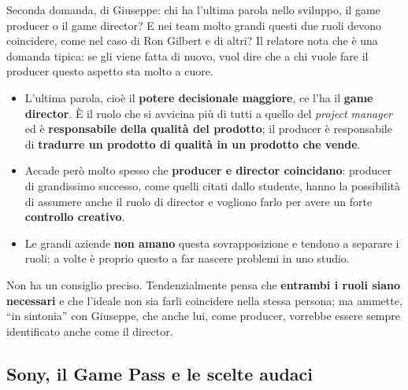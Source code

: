 Seconda domanda, di Giuseppe: chi ha l'ultima parola nello sviluppo, il game
producer o il game director? E nei team molto grandi questi due ruoli devono
coincidere, come nel caso di Ron Gilbert e di altri? Il relatore nota che è una
domanda tipica: se gli viene fatta di nuovo, vuol dire che a chi vuole fare il
producer questo aspetto sta molto a cuore.
\begin{itemize}
  \item L'ultima parola, cioè il \textbf{potere decisionale maggiore}, ce l'ha
        il \textbf{game director}. È il ruolo che si avvicina più di tutti a
        quello del \emph{project manager} ed è \textbf{responsabile della
        qualità del prodotto}; il producer è responsabile di \textbf{tradurre
        un prodotto di qualità in un prodotto che vende}.
  \item Accade però molto spesso che \textbf{producer e director coincidano}:
        producer di grandissimo successo, come quelli citati dallo studente,
        hanno la possibilità di assumere anche il ruolo di director e vogliono
        farlo per avere un forte \textbf{controllo creativo}.
  \item Le grandi aziende \textbf{non amano} questa sovrapposizione e tendono a
        separare i ruoli; a volte è proprio questo a far nascere problemi in uno
        studio.
\end{itemize}
Non ha un consiglio preciso. Tendenzialmente pensa che \textbf{entrambi i ruoli
siano necessari} e che l'ideale non sia farli coincidere nella stessa persona;
ma ammette, ``in sintonia'' con Giuseppe, che anche lui, come producer,
vorrebbe essere sempre identificato anche come il director.

\subsection{Sony, il Game Pass e le scelte audaci}

